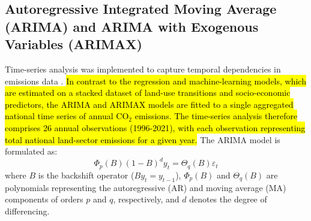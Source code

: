 \documentclass[10pt,letterpaper]{article}
\begin{document}
%

\subsection{Autoregressive Integrated Moving Average (ARIMA) and ARIMA with Exogenous Variables (ARIMAX)}

Time-series analysis was implemented to capture temporal dependencies in emissions data \cite{tanania2020time, rehman2024forecasting}. \hl{In contrast to the regression and machine-learning models, which are estimated on a stacked dataset of land-use transitions and socio-economic predictors, the ARIMA and ARIMAX models are fitted to a single aggregated national time series of annual CO$_2$ emissions. The time-series analysis therefore comprises 26 annual observations (1996-2021), with each observation representing total national land-sector emissions for a given year.} The ARIMA model is formulated as:
\begin{equation}
\Phi_p(B)(1 - B)^d y_t = \Theta_q(B) \varepsilon_t
\end{equation}
where \( B \) is the backshift operator (\(B y_t = y_{t-1}\)), \( \Phi_p(B) \) and \( \Theta_q(B) \) are polynomials representing the autoregressive (AR) and moving average (MA) components of orders \( p \) and \( q \), respectively, and \( d \) denotes the degree of differencing. 
\end{document}
